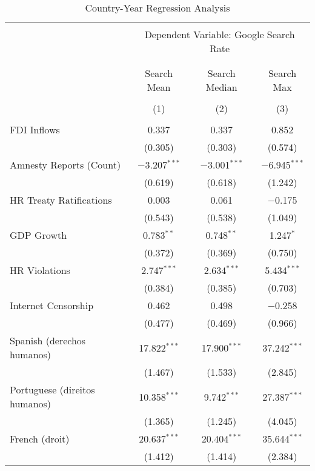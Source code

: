 
\begin{table}[!htbp] \centering 
  \caption{Country-Year Regression Analysis} 
  \label{} 
\begin{tabular}{@{\extracolsep{5pt}}lccc} 
\\[-1.8ex]\hline 
\hline \\[-1.8ex] 
 & \multicolumn{3}{c}{Dependent Variable: Google Search Rate} \\ 
\cline{2-4} 
\\[-1.8ex] & \multicolumn{3}{c}{ } \\ 
 & Search Mean & Search Median & Search Max \\ 
\\[-1.8ex] & (1) & (2) & (3)\\ 
\hline \\[-1.8ex] 
 FDI Inflows & 0.337 & 0.337 & 0.852 \\ 
  & (0.305) & (0.303) & (0.574) \\ 
  Amnesty Reports (Count) & $-$3.207$^{***}$ & $-$3.001$^{***}$ & $-$6.945$^{***}$ \\ 
  & (0.619) & (0.618) & (1.242) \\ 
  HR Treaty Ratifications & 0.003 & 0.061 & $-$0.175 \\ 
  & (0.543) & (0.538) & (1.049) \\ 
  GDP Growth & 0.783$^{**}$ & 0.748$^{**}$ & 1.247$^{*}$ \\ 
  & (0.372) & (0.369) & (0.750) \\ 
  HR Violations & 2.747$^{***}$ & 2.634$^{***}$ & 5.434$^{***}$ \\ 
  & (0.384) & (0.385) & (0.703) \\ 
  Internet Censorship & 0.462 & 0.498 & $-$0.258 \\ 
  & (0.477) & (0.469) & (0.966) \\ 
  Spanish (derechos humanos) & 17.822$^{***}$ & 17.900$^{***}$ & 37.242$^{***}$ \\ 
  & (1.467) & (1.533) & (2.845) \\ 
  Portuguese (direitos humanos) & 10.358$^{***}$ & 9.742$^{***}$ & 27.387$^{***}$ \\ 
  & (1.365) & (1.245) & (4.045) \\ 
  French (droit) & 20.637$^{***}$ & 20.404$^{***}$ & 35.644$^{***}$ \\ 
  & (1.412) & (1.414) & (2.384) \\ 

\end{tabular}
\end{table}
